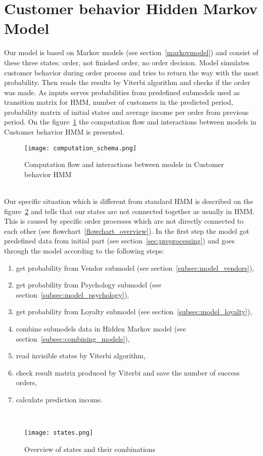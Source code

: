 \section{Customer behavior Hidden Markov Model} \label{sec:submodels}
Our model is based on Markov models (see section~\ref{markovmodel}) and consist of these three states: order, not finished order, no order decision.
Model simulates customer behavior during order process and tries to return the way with the most probability.
Then reads the results by Viterbi algorithm and checks if the order was made.
As inputs serves probabilities from predefined submodels used as transition matrix for HMM, number of customers in the predicted period,
probability matrix of initial states and average income per order from previous period.
On the figure~\ref{Model schema with interaction} the computation flow and interactions between models in Customer behavior HMM is presented.\\
\begin{figure}[h!]
    \begin{center}
        \texttt{[image: computation\_schema.png]}
    \end{center}
    \caption{Computation flow and interactions between models in Customer behavior HMM}
    \label{Model schema with interaction}
\end{figure}\\
Our specific situation which is different from standard HMM is described on the figure~\ref{states} and tells that our states are not connected together as usually in HMM.
This is caused by specific order processes which are not directly connected to each other (see flowchart~\ref{flowchart_overview}).
In the first step the model got predefined data from initial part (see section~\ref{sec:preprocessing}) and goes through the model according to the following steps:
\begin{enumerate}
    \item get probability from Vendor submodel (see section~\ref{subsec:model_vendors}),
    \item get probability from Psychology submodel (see section~\ref{subsec:model_psychology}),
    \item get probability from Loyalty submodel (see section~\ref{subsec:model_loyalty}),
    \item combine submodels data in Hidden Markov model (see section~\ref{subsec:combining_models}),
    \item read invisible states by Viterbi algorithm,
    \item check result matrix produced by Viterbi and save the number of success orders,
    \item calculate prediction income.
\end{enumerate}\\
\begin{figure}[h!]
    \begin{center}
        \texttt{[image: states.png]}
    \end{center}
    \caption{Overview of states and their combinations}
    \label{states}
\end{figure}\\
